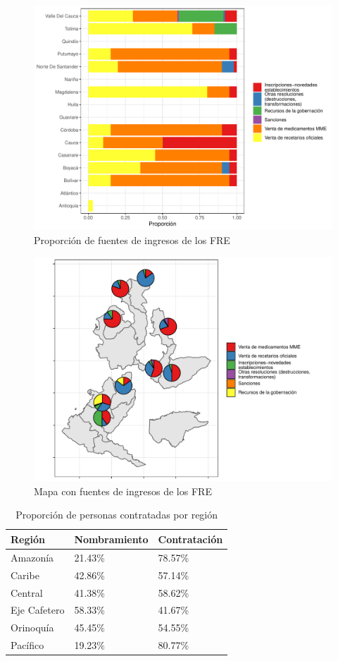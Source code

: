\documentclass[
]{book}
\begin{document}
\begin{figure}
\includegraphics[width=0.85\linewidth]{InformeFinal_files/figure-latex/IngresosFRE1-1} \caption{Proporción de fuentes de ingresos de los FRE}\label{fig:IngresosFRE1}
\end{figure}
\begin{figure}
\includegraphics[width=0.85\linewidth]{InformeFinal_files/figure-latex/IngresosFRE2-1} \caption{Mapa con fuentes de ingresos de los FRE}\label{fig:IngresosFRE2}
\end{figure}

\begin{table}

\caption{\label{tab:CaracterizacionIngreso1}Proporción de personas contratadas por región}
\centering
\begin{tabular}[t]{lll}
\toprule
Región & Nombramiento & Contratación\\
\midrule
Amazonía & 21.43\% & 78.57\%\\
Caribe & 42.86\% & 57.14\%\\
Central & 41.38\% & 58.62\%\\
Eje Cafetero & 58.33\% & 41.67\%\\
Orinoquía & 45.45\% & 54.55\%\\
\addlinespace
Pacífico & 19.23\% & 80.77\%\\
\bottomrule
\end{tabular}
\end{table}
\end{document}
